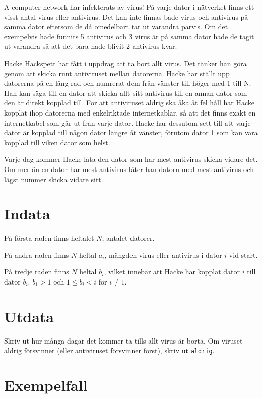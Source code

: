 
A computer network har infekterats av virus! På varje dator i nätverket finns ett visst antal virus eller antivirus. Det kan inte finnas både virus och antivirus på samma dator eftersom de då omedelbart tar ut varandra parvis. Om det exempelvis hade funnits 5 antivirus och 3 virus är på samma dator hade de tagit ut varandra så att det bara hade blivit 2 antivirus kvar.

Hacke Hackspett har fått i uppdrag att ta bort allt virus. Det tänker han göra genom att skicka runt antiviruset mellan datorerna. Hacke har ställt upp datorerna på en lång rad och numrerat dem från vänster till höger med 1 till N. Han kan säga till en dator att skicka allt sitt antivirus till en annan dator som den är direkt kopplad till. För att antiviruset aldrig ska åka åt fel håll har Hacke kopplat ihop datorerna med enkelriktade internetkablar, så att det finns exakt en internetkabel som går ut från varje dator. Hacke har dessutom sett till att varje dator är kopplad till någon dator längre åt vänster, förutom dator 1 som kan vara kopplad till viken dator som helst.

Varje dag kommer Hacke låta den dator som har mest antivirus skicka vidare det. Om mer än en dator har mest antivirus låter han datorn med mest antivirus och lägst nummer skicka vidare sitt.

\section*{Indata}
På första raden finns heltalet $N$, antalet datorer.

På andra raden finns $N$ heltal $a_i$, mängden virus eller antivirus i dator $i$ vid start.

På tredje raden finns $N$ heltal $b_i$, vilket innebär att Hacke har kopplat dator $i$ till dator $b_i$. $b_1 > 1$ och $1 \leq b_i < i$ för $i \neq 1$.

\section*{Utdata}
Skriv ut hur många dagar det kommer ta tills allt virus är borta. Om viruset aldrig försvinner (eller antiviruset försvinner först), skriv ut \texttt{aldrig}.

\section*{Exempelfall}
